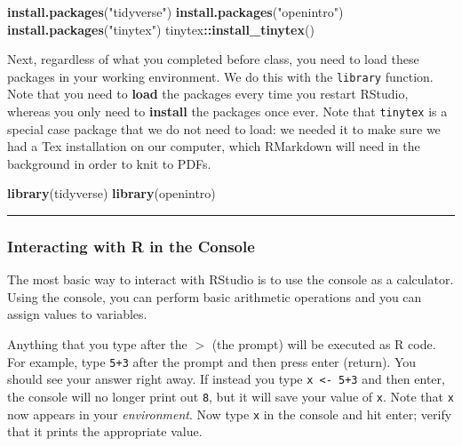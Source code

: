 \documentclass[
]{article}
\newenvironment{Shaded}{\begin{snugshade}}{\end{snugshade}}
\newcommand{\FunctionTok}[1]{\textcolor[rgb]{0.13,0.29,0.53}{\textbf{#1}}}
\newcommand{\NormalTok}[1]{#1}
\newcommand{\SpecialCharTok}[1]{\textcolor[rgb]{0.81,0.36,0.00}{\textbf{#1}}}
\newcommand{\StringTok}[1]{\textcolor[rgb]{0.31,0.60,0.02}{#1}}
\begin{document}
\begin{Shaded}
\begin{Highlighting}[]
\FunctionTok{install.packages}\NormalTok{(}\StringTok{"tidyverse"}\NormalTok{)}
\FunctionTok{install.packages}\NormalTok{(}\StringTok{"openintro"}\NormalTok{)}
\FunctionTok{install.packages}\NormalTok{(}\StringTok{"tinytex"}\NormalTok{)}
\NormalTok{tinytex}\SpecialCharTok{::}\FunctionTok{install\_tinytex}\NormalTok{()}
\end{Highlighting}
\end{Shaded}

Next, regardless of what you completed before class, you need to load
these packages in your working environment. We do this with the
\texttt{library} function. Note that you need to \textbf{load} the
packages every time you restart RStudio, whereas you only need to
\textbf{install} the packages once ever. Note that \texttt{tinytex} is a
special case package that we do not need to load: we needed it to make
sure we had a Tex installation on our computer, which RMarkdown will
need in the background in order to knit to PDFs.

\begin{Shaded}
\begin{Highlighting}[]
\FunctionTok{library}\NormalTok{(tidyverse)}
\FunctionTok{library}\NormalTok{(openintro)}
\end{Highlighting}
\end{Shaded}

\begin{center}\rule{0.5\linewidth}{0.5pt}\end{center}

\subsubsection{Interacting with R in the
Console}\label{interacting-with-r-in-the-console}

The most basic way to interact with RStudio is to use the console as a
calculator. Using the console, you can perform basic arithmetic
operations and you can assign values to variables.

Anything that you type after the \(>\) (the prompt) will be executed as
R code. For example, type \texttt{5+3} after the prompt and then press
enter (return). You should see your answer right away. If instead you
type \texttt{x\ \textless{}-\ 5+3} and then enter, the console will no
longer print out \texttt{8}, but it will save your value of \texttt{x}.
Note that \texttt{x} now appears in your \emph{environment}. Now type
\texttt{x} in the console and hit enter; verify that it prints the
appropriate value.
\end{document}
